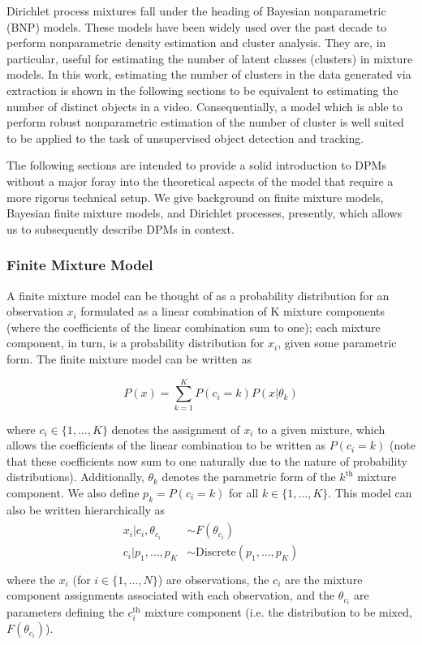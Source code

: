 \documentclass{article}
\begin{document}
Dirichlet process mixtures fall under the heading of Bayesian nonparametric (BNP) models. These models have been widely used over the past decade to perform nonparametric density estimation and cluster analysis. They are, in particular, useful for estimating the number of latent classes (clusters) in mixture models. In this work, estimating the number of clusters in the data generated via extraction is shown in the following sections to be equivalent to estimating the number of distinct objects in a video. Consequentially, a model which is able to perform robust nonparametric estimation of the number of cluster is well suited to be applied to the task of unsupervised object detection and tracking.

The following sections are intended to provide a solid introduction to DPMs without a major foray into the theoretical aspects of the model that require a more rigorus technical setup. We give background on finite mixture models, Bayesian finite mixture models, and Dirichlet processes, presently, which allows us to subsequently describe DPMs in context. 


\subsubsection{Finite Mixture Model}

A finite mixture model can be thought of as a probability distribution for an observation $x_{i}$ formulated as a linear combination of K mixture components (where the coefficients of the linear combination sum to one); each mixture component, in turn, is a probability distribution for $x_{i}$, given some parametric form. The finite mixture model can be written as

\begin{equation}
P(x) = \sum_{k=1}^{K} P(c_{i} = k)P(x|\theta_{k})
\end{equation}

where $c_{i} \in \{ 1, \ldots, K \}$ denotes the assignment of $x_{i}$ to a given mixture, which allows the coefficients of the linear combination to be written as $P(c_{i} = k)$ (note that these coefficients now sum to one naturally due to the nature of probability distributions). Additionally, $\theta_{k}$ denotes the parametric form of the $k^{\text{th}}$ mixture component. We also define $p_{k} = P(c_{i} = k)$ for all $k \in \{ 1, \ldots, K \} $. This model can also be written hierarchically as
\begin{align}
\begin{split}
	x_{i}|c_{i}, \theta_{c_{i}}  &\sim  F(\theta_{c_{i}}) \\
	c_{i}|p_{1}, \ldots, p_{K}  &\sim  \text{Discrete}(p_{1}, \ldots, p_{K}) \\
\end{split}
\end{align}
where the $x_{i}$ (for $i \in \{ 1, \ldots, N \}$) are observations, the $c_{i}$ are the mixture component assignments associated with each observation, and the $\theta_{c_{i}}$ are parameters defining the $c_{i}^{\text{th}}$ mixture component (i.e. the distribution to be mixed, $F(\theta_{c_{i}})$).
\end{document}
